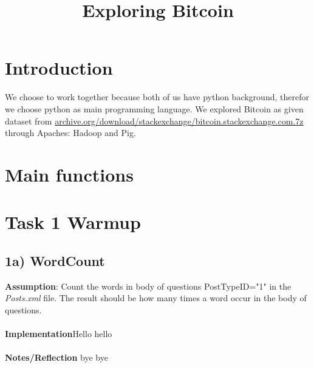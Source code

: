 \documentclass[fleqn,10pt]{wlscirep}
\title{Exploring Bitcoin }
\author{}
\begin{document}





\flushbottom
\maketitle


\section*{Introduction}
We choose to work together because both of us have python background, therefor we choose python as main programming language. We explored Bitcoin as given dataset from \url{archive.org/download/stackexchange/bitcoin.stackexchange.com.7z}  through Apaches: Hadoop and Pig. 

\section*{Main functions}

\section*{Task 1 Warmup}
\subsection*{1a) WordCount}
\textbf{Assumption}: Count the words in body of questions PostTypeID="1"  in the \textit{Posts.xml}  file. The result should be how many times a word occur in the body of questions.\\ \\
\textbf{Implementation}Hello hello \\ \\
\textbf{Notes/Reflection} bye bye  \\ \\
\end{document}
